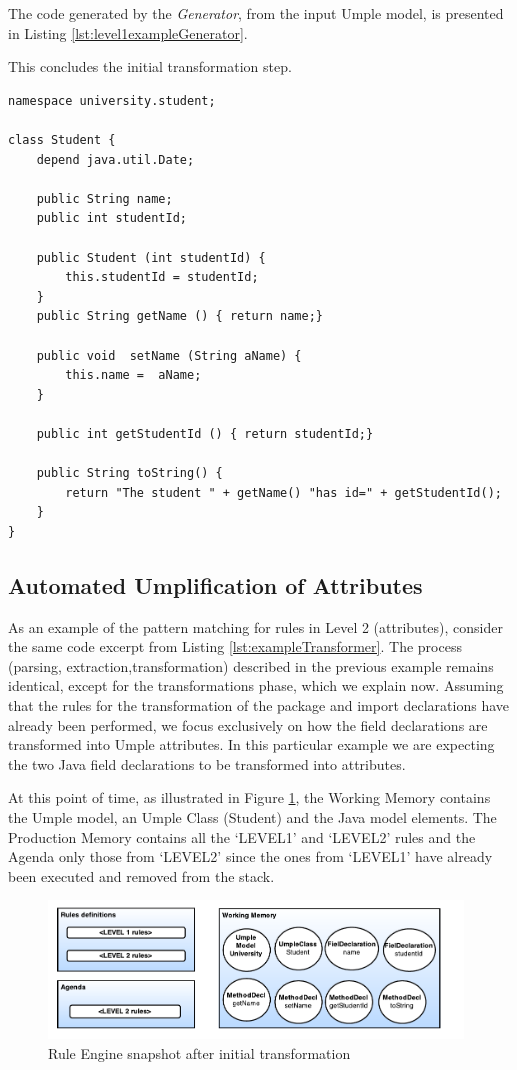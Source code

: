 The code generated by the \textit{Generator}, from the input Umple model, is presented in Listing \ref{lst:level1exampleGenerator}. 

This concludes the initial transformation step.

\begin{lstlisting}[style=umpleOut, label=lst:level1exampleGenerator, caption=Umple code generated -- Level 1]
namespace university.student;

class Student {
	depend java.util.Date;
	
    public String name;
    public int studentId;
    
    public Student (int studentId) {
    	this.studentId = studentId;
    }
    public String getName () { return name;}
    
    public void  setName (String aName) { 
    	this.name =  aName;
    }
   
    public int getStudentId () { return studentId;}

    public String toString() {
    	return "The student " + getName() "has id=" + getStudentId();
    }
}   
\end{lstlisting}

\subsection{Automated Umplification of Attributes}

As an example of the pattern matching for rules in Level 2 (attributes), consider the same code excerpt from Listing \ref{lst:exampleTransformer}. The process (parsing, extraction,transformation) described in the previous example remains identical, except for the transformations phase, which we explain now. Assuming that the rules for the transformation of the package and import declarations have already been performed, we focus exclusively on how the field declarations are transformed into Umple attributes. In this particular example we are expecting the two Java field declarations to be transformed into attributes. 

At this point of time, as illustrated in Figure \ref{fig:ruleModel2}, the Working Memory contains the Umple model, an Umple Class (Student) and the Java model elements. The Production Memory contains all the `LEVEL1' and `LEVEL2' rules and the Agenda only those from `LEVEL2' since the ones from `LEVEL1' have already been executed and removed from the stack.

\begin{figure}[h]
\centering
\includegraphics[width=0.98\textwidth]{Figures/ruleModel2.pdf}
\caption{Rule Engine snapshot after initial transformation}
\label{fig:ruleModel2}
\end{figure}

